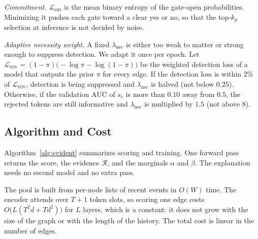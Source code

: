 \documentclass[pdflatex,sn-basic]{sn-jnl}
\newcommand{\Lcal}{\mathcal{L}}
\newcommand{\Rcal}{\mathcal{R}}
\theoremstyle{definition}
\theoremstyle{plain}
\begin{document}
\emph{Commitment.} $\Lcal_{\text{ent}}$ is the mean binary entropy of the
gate-open probabilities. Minimizing it pushes each gate toward a clear yes or
no, so that the top-$k_p$ selection at inference is not decided by noise.

\emph{Adaptive necessity weight.} A fixed $\lambda_{\text{nec}}$ is either too
weak to matter or strong enough to suppress detection. We adapt it once per
epoch. Let $\Lcal_{\text{triv}}=(1-\pi)\big(-\log\pi-\log(1-\pi)\big)$ be the
weighted detection loss of a model that outputs the prior $\pi$ for every
edge. If the detection loss is within $2\%$ of $\Lcal_{\text{triv}}$, detection
is being suppressed and $\lambda_{\text{nec}}$ is halved (not below $0.25$).
Otherwise, if the validation AUC of $s_c$ is more than $0.10$ away from $0.5$,
the rejected tokens are still informative and $\lambda_{\text{nec}}$ is
multiplied by $1.5$ (not above $8$).

\subsection{Algorithm and Cost}
Algorithm~\ref{alg:evident} summarizes scoring and training. One forward pass
returns the score, the evidence $\Rcal$, and the marginals $\alpha$ and
$\beta$. The explanation needs no second model and no extra pass.

The pool is built from per-node lists of recent events in $O(W)$ time. The
encoder attends over $T+1$ token slots, so scoring one edge costs
$O\big(L(T^2 d+T d^2)\big)$ for $L$ layers, which is a constant: it does not grow with the
size of the graph or with the length of the history. The total cost is linear
in the number of edges.
\end{document}
